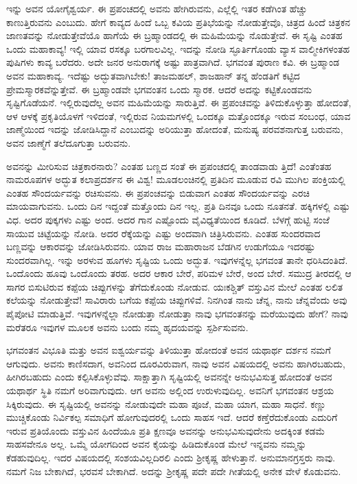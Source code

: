 ಇನ್ನು ಅವನ ಯೋಗೈಶ್ವರ್ಯ. ಈ ಪ್ರಪಂಚದಲ್ಲಿ ಅವನು ಹೇಗಿರುವನು, ಎಲ್ಲೆಲ್ಲಿ ಇತರ ಕಡೆಗಿಂತ ಹೆಚ್ಚು ಕಾಣುತ್ತಿರುವನು ಎಂಬುದು. ಹೇಗೆ ಕಾವ್ಯದ ಹಿಂದೆ ಒಬ್ಬ ಕವಿಯ ಪ್ರತಿಭೆಯನ್ನು ನೋಡುತ್ತೇವೊ, ಚಿತ್ರದ ಹಿಂದೆ ಚಿತ್ರಕನ ಜಾಣತವನ್ನು ನೋಡುತ್ತೇವೆಯೊ ಹಾಗೆಯೆ ಈ ಬ್ರಹ್ಮಾಂಡದಲ್ಲಿ ಈ ಮಹಿಮೆಯನ್ನು ನೊಡುತ್ತೇವೆ. ಈ ಸೃಷ್ಟಿ ಎಂತಹ ಒಂದು ಮಹಾಕಾವ್ಯ! ಇಲ್ಲಿ ಯಾವ ರಸಕ್ಕೂ ಬರಗಾಲವಿಲ್ಲ. ಇದನ್ನು ನೋಡಿ ಸ್ಫೂರ್ತಿಗೊಂಡು ವ್ಯಾಸ ವಾಲ್ಮೀಕಿಗಳಂತಹ ಪುಷಿಗಳು ಕಾವ್ಯ ಬರೆದರು. ಅದೇ ಜನರ ಅನುರಾಗಕ್ಕೆ ಅಷ್ಟು ಪಾತ್ರವಾಗಿದೆ. ಭಗವಂತ ಪುರಾಣ ಕವಿ. ಈ ಬ್ರಹ್ಮಾಂಡ ಅವನ ಮಹಾಕಾವ್ಯ. ಇದೆಷ್ಟು ಅದ್ಭುತವಾಗಿಬೇಕು! ತಾಜಮಹಲ್, ಶಾಜಹಾನ್ ತನ್ನ ಹೆಂಡತಿಗೆ ಕಟ್ಟಿದ ಪ್ರೇಮಸ್ಮಾರಕವೆನ್ನುತ್ತೇವೆ. ಈ ಬ್ರಹ್ಮಾಂಡವೇ ಭಗವಂತನ ಒಂದು ಸ್ಮಾರಕ. ಆದರೆ ಅದನ್ನು ಕಟ್ಟಿಕೊಂಡವನು ಸೃಷ್ಟಿಗೊಡೆಯನೆ. ಇಲ್ಲಿರುವುದೆಲ್ಲ ಅವನ ಮಹಿಮೆಯನ್ನು ಸಾರುತ್ತಿವೆ. ಈ ಪ್ರಪಂಚವನ್ನು ತಿಳಿದುಕೊಳ್ಳುತ್ತಾ ಹೋದಂತೆ, ಆಳ ಆಳಕ್ಕೆ ಪ್ರಕೃತಿಯೊಳಗೆ ಇಳಿದಂತೆ, ಇಲ್ಲಿರುವ ನಿಯಮಗಳಲ್ಲಿ ಒಂದಕ್ಕೂ ಮತ್ತೊಂದಕ್ಕೂ ಇರುವ ಸಂಬಂಧ, ಯಾವ ಜಾಣ್ಮೆಯಿಂದ ಇದನ್ನು ಜೋಡಿಸಿದ್ದಾನೆ ಎಂಬುದನ್ನು ಅರಿಯುತ್ತಾ ಹೋದಂತೆ, ಮನುಷ್ಯ ಪರವಶನಾಗುತ್ತ ಬರುವನು, ಅವನ ಜಾಣ್ಮೆಗೆ ತಲೆದೂಗುತ್ತಾ ಬರುವನು.

ಅವನನ್ನು ಮೀರಿಸುವ ಚಿತ್ರಕಾರನಾರು? ಎಂತಹ ಬಣ್ಣದ ಸಂತೆ ಈ ಪ್ರಪಂಚದಲ್ಲಿ ತಾಂಡವಾಡು ತ್ತಿದೆ! ಎಂತೆಂತಹ ನಾಮರೂಪಗಳ ಅದ್ಭುತ ಕಲಾಪ್ರದರ್ಶನ ಈ ವಿಶ್ವ! ಮೂಡಲಂಚಿನಲ್ಲಿ ಪ್ರತಿದಿನ ಮೂಡುವ ರವಿ ಮುಗಿಲ ಪಂಕ್ತಿಯಲ್ಲಿ ಎಂತಹ ಸೌಂದರ್ಯವನ್ನು ರಚಿಸುವನು. ಈ ಪ್ರಪಂಚವನ್ನು ಬಿಡುವಾಗ ಎಂತಹ ಸೌಂದರ್ಯವನ್ನು ಎರಚಿ ಮಾಯವಾಗುವನು. ಒಂದು ದಿನ ಇದ್ದಂತೆ ಮತ್ತೊಂದು ದಿನ ಇಲ್ಲ. ಪ್ರತಿ ದಿನವೂ ಒಂದು ನೂತನತೆ. ಹಕ್ಕಿಗಳಲ್ಲಿ ಎಷ್ಟು ವಿಧ. ಅದರ ಪುಕ್ಕಗಳು ಎಷ್ಟು ಅಂದ. ಅದರ ಗಾನ ಎಷ್ಟೊಂದು ವೈವಿಧ್ಯತೆಯಿಂದ ಕೂಡಿದೆ. ಬೆಳಗ್ಗೆ ಹುಟ್ಟಿ ಸಂಜೆ ಸಾಯುವ ಚಿಟ್ಟೆಯನ್ನು ನೋಡಿ. ಅದರ ರೆಕ್ಕೆಯನ್ನು ಎಷ್ಟು ಅಂದವಾಗಿ ಚಿತ್ರಿಸಿರುವನು. ಎಂತಹ ಸುಂದರವಾದ ಬಣ್ಣವನ್ನು ಆಕಾರವನ್ನು ಜೋಡಿಸಿರುವನು. ಯಾವ ರಾಜ ಮಹಾರಾಜನ ಬೆಡಗಿನ ಉಡುಗೆಯೂ ಇದರಷ್ಟು ಸುಂದರವಾಗಿಲ್ಲ. ಇನ್ನು ಅರಳುವ ಹೂಗಳು ಸೃಷ್ಟಿಯ ಒಂದು ಅದ್ಭುತ. ಇವುಗಳನ್ನೆಲ್ಲ ಭಗವಂತ ತಾನೇ ಧರಿಸಿದಂತಿದೆ. ಒಂದೊಂದು ಹೂವು ಒಂದೊಂದು ತರಹ. ಅದರ ಆಕಾರ ಬೇರೆ, ಪರಿಮಳ ಬೇರೆ, ಅಂದ ಬೇರೆ. ಸಮುದ್ರ ತೀರದಲ್ಲಿ ಆ ಸಾಗರ ಬಿಸುಟಿರುವ ಕಪ್ಪೆಯ ಚಿಪ್ಪುಗಳನ್ನು ತೆಗೆದುಕೊಂಡು ನೋಡುವ. ಯಃಕಶ್ಚಿತ್ ವಸ್ತುವಿನ ಮೇಲೆ ಎಂತಹ ಲಲಿತ ಕಲೆಯನ್ನು ನೋಡುತ್ತೇವೆ! ಸಾವಿರಾರು ಬಗೆಯ ಕಪ್ಪೆಯ ಚಿಪ್ಪುಗಳಿವೆ. ನಿನಗಿಂತ ನಾನು ಚೆನ್ನ, ನಾನು ಚೆನ್ನವೆಂದು ಅವು ಪೈಪೋಟಿ ಮಾಡುತ್ತಿವೆ. ಇವುಗಳನ್ನೆಲ್ಲಾ ನೋಡುತ್ತಾ ನೋಡುತ್ತಾ ನಾವು ಭಗವಂತನನ್ನು ಮರೆಯುವುದು ಹೇಗೆ? ನಾವು ಮರೆತರೂ ಇವುಗಳ ಮೂಲಕ ಅವನು ಬಂದು ನಮ್ಮ ಹೃದಯವನ್ನು ಸ್ಪರ್ಶಿಸುವನು.

ಭಗವಂತನ ವಿಭೂತಿ ಮತ್ತು ಅವನ ಐಶ್ವರ್ಯವನ್ನು ತಿಳಿಯುತ್ತಾ ಹೋದಂತೆ ಅವನ ಯಥಾರ್ಥ ದರ್ಶನ ನಮಗೆ ಆಗುವುದು. ಅವನು ಕಾಣಿಸದಾಗ, ಅವನಿಂದ ದೂರವಿರುವಾಗ, ನಾವು ಅವನ ವಿಷಯದಲ್ಲಿ ಅವನು ಹಾಗಿರಬಹುದು, ಹೀಗಿರಬಹುದು ಎಂದು ಕಲ್ಪಿಸಿಕೊಳ್ಳುವೆವು. ಸಾಕ್ಷಾತ್ತಾಗಿ ಸೃಷ್ಟಿಯಲ್ಲಿ ಅವನನ್ನೇ ಅನುಭವಿಸುತ್ತ ಹೋದಂತೆ ಅವನ ಯಥಾರ್ಥ ಸ್ಥಿತಿ ನಮಗೆ ಅರಿವಾಗುವುದು. ಆಗ ಅವನು ಅಲ್ಲಿಂದ ಉರುಳುವುದಿಲ್ಲ. ಅವನಿಗೆ ಭಗವಂತನ ಆಶ್ರಯ ಸಿಕ್ಕಿರುವುದು. ಈ ಸೃಷ್ಟಿಯಲ್ಲಿ ಅವನನ್ನು ನೋಡುವುದೇ ಮಹಾ ಪೂಜೆ, ಮಹಾ ಯಾಗ, ಮಹಾ ಸಾಧನೆ. ಕಣ್ಣು ಮುಚ್ಚಿಕೊಂಡು ನಿರ್ವಿಕಲ್ಪ ಸಮಾಧಿಗೆ ಹೋಗುವುದರಲ್ಲಿ ಒಂದು ಸಾಹಸ ಇದೆ. ಆದರೆ ಕಣ್ತೆರೆದುಕೊಂಡು ಎದುರಿಗೆ ಇರುವ ಪ್ರತಿಯೊಂದು ವಸ್ತುವಿನ ಹಿಂದೆಯೂ ಪ್ರತಿ ಕ್ಷಣವೂ ಅವನನ್ನು ಅನುಭವಿಸುವುದೇನು ಅದಕ್ಕಿಂತ ಕಡಮೆ ಸಾಹಸವೇನೂ ಅಲ್ಲ. ಒಮ್ಮೆ ಯೋಗದಿಂದ ಅವನ ಕೈಯನ್ನು ಹಿಡಿದುಕೊಂಡ ಮೇಲೆ ಇನ್ನವನು ನಮ್ಮನ್ನು ಕೆಡಹುವುದಿಲ್ಲ. ಇದರ ವಿಷಯದಲ್ಲಿ ಸಂಶಯವಿಲ್ಲದಿರಲಿ ಎಂದು ಶ್ರೀಕೃಷ್ಣ ಹೇಳುತ್ತಾನೆ. ಅನುಮಾನಗ್ರಸ್ತರು ನಾವು. ನಮಗೆ ನಿಜ ಬೇಕಾಗಿದೆ, ಭರವಸೆ ಬೇಕಾಗಿದೆ. ಅದನ್ನು ಶ್ರೀಕೃಷ್ಣ ಪದೇ ಪದೇ ಗೀತೆಯಲ್ಲಿ ಅನೇಕ ವೇಳೆ ಕೊಡುವನು.

